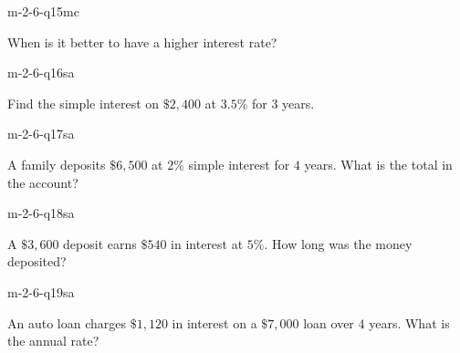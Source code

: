 \begin{practiceQuestion}{m-2-6-q15}{mc}
\begin{questionText}
When is it better to have a higher interest rate?
\end{questionText}
\end{practiceQuestion}


\begin{practiceQuestion}{m-2-6-q16}{sa}
\begin{questionText}
Find the simple interest on $\$2{,}400$ at $3.5\%$ for $3$ years.
\end{questionText}
\end{practiceQuestion}

\begin{practiceQuestion}{m-2-6-q17}{sa}
\begin{questionText}
A family deposits $\$6{,}500$ at $2\%$ simple interest for $4$ years. What is the total in the account?
\end{questionText}
\end{practiceQuestion}

\begin{practiceQuestion}{m-2-6-q18}{sa}
\begin{questionText}
A $\$3{,}600$ deposit earns $\$540$ in interest at $5\%$. How long was the money deposited?
\end{questionText}
\end{practiceQuestion}

\begin{practiceQuestion}{m-2-6-q19}{sa}
\begin{questionText}
An auto loan charges $\$1{,}120$ in interest on a $\$7{,}000$ loan over $4$ years. What is the annual rate?
\end{questionText}
\end{practiceQuestion}

